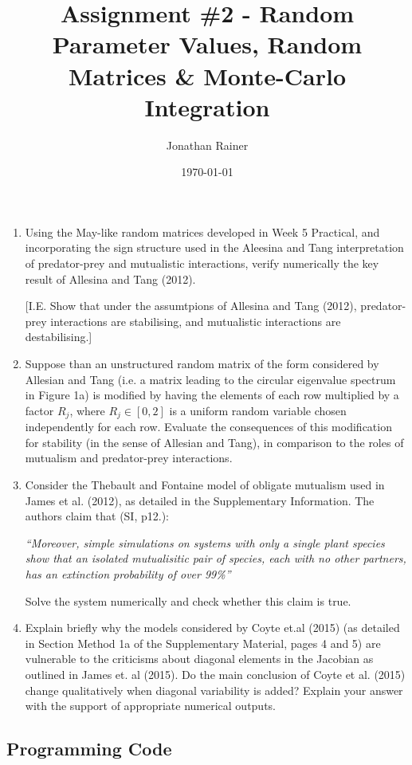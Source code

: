 \documentclass[11pt]{scrreprt}
\title{Assignment \#2 - Random Parameter Values, Random Matrices \& Monte-Carlo Integration}
\date{\today}
\author{Jonathan Rainer}
\begin{document}
	\fancyhf{}
	\chead{\thepage}
	\rhead{\today}
	\renewcommand{\headrulewidth}{0.3pt}
	\renewcommand{\footrulewidth}{0.3pt}
	\renewcommand{\footrulewidth}{0pt}
	\maketitle
	
	\begin{enumerate}
		\item Using the May-like random matrices developed in Week 5 Practical, and incorporating the sign structure used in the Aleesina and Tang interpretation of predator-prey and mutualistic interactions, verify numerically the key result of Allesina and Tang (2012). 
		
		[I.E. Show that under the assumtpions of Allesina and Tang (2012), predator-prey interactions are stabilising, and mutualistic interactions are destabilising.]
		
		
		
		\item Suppose than an unstructured random matrix of the form considered by Allesian and Tang (i.e. a matrix leading to the circular eigenvalue spectrum in Figure 1a) is modified by having the elements of each row multiplied by a factor $R_j$, where $R_j \in [0, 2]$ is a uniform random variable chosen independently for each row. Evaluate the consequences of this modification for stability (in the sense of Allesian and Tang), in comparison to the roles of mutualism and predator-prey interactions.
		
		\item Consider the Thebault and Fontaine model of obligate mutualism used in James et al. (2012), as detailed in the Supplementary Information. The authors claim that (SI, p12.): 
		
		\emph{``Moreover, simple simulations on systems with only a single plant species show that an isolated mutualisitic pair of species, each with no other partners, has an extinction probability of over 99\%'' }
		
		Solve the system numerically and check whether this claim is true.
		
		\item Explain briefly why the models considered by Coyte et.al (2015) (as detailed in Section Method 1a of the Supplementary Material, pages 4 and 5) are vulnerable to the criticisms about diagonal elements in the Jacobian as outlined in James et. al (2015). Do the main conclusion of Coyte et al. (2015) change qualitatively when diagonal variability is added? Explain your answer with the support of appropriate numerical outputs.
		
	\end{enumerate}
	
	
	\begin{appendices}
		\chapter{Programming Code}
		
	\end{appendices}
\end{document}
